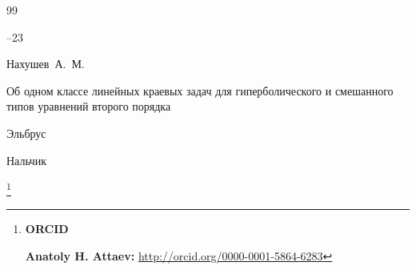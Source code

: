 \begin{thebibliography}{99}

--23





\by Нахушев~А.~М.

\book Об одном классе линейных краевых задач для гиперболического и смешанного типов уравнений второго порядка


\publ Эльбрус

\publaddr Нальчик






\end{thebibliography}





\RuDate



\newpage



\makeentitle



\thanks{{\bf ORCID}

{

{\bf Anatoly H. Attaev:} \url{http://orcid.org/0000-0001-5864-6283}

}

}







\EngRef



